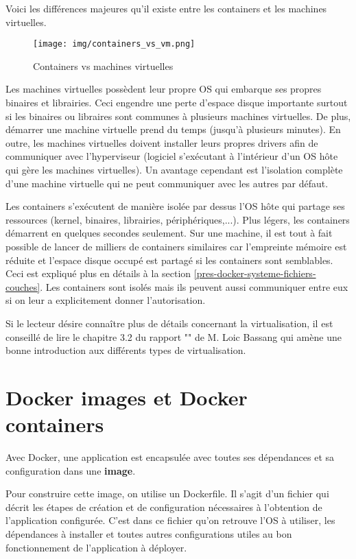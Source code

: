 Voici les différences majeures qu'il existe entre les containers et les machines virtuelles\cite{what_is_docker}.

\begin{figure}[hbtp]
\centering
\texttt{[image: img/containers\_vs\_vm.png]}
\caption{Containers vs machines virtuelles}
\end{figure}

Les machines virtuelles possèdent leur propre OS qui embarque ses propres binaires et librairies. Ceci engendre une perte d'espace disque importante surtout si les binaires ou libraires sont communes à plusieurs machines virtuelles. De plus, démarrer une machine virtuelle prend du temps (jusqu'à plusieurs minutes). En outre, les machines virtuelles doivent installer leurs propres drivers afin de communiquer avec l'hyperviseur (logiciel s'exécutant à l'intérieur d'un OS hôte qui gère les machines virtuelles). Un avantage cependant est l'isolation complète d'une machine virtuelle qui ne peut communiquer avec les autres par défaut.

Les containers s'exécutent de manière isolée par dessus l'OS hôte qui partage ses ressources (kernel, binaires, librairies, périphériques,...). Plus légers, les containers démarrent en quelques secondes seulement. Sur une machine, il est tout à fait possible de lancer de milliers de containers similaires car l'empreinte mémoire est réduite et l'espace disque occupé est partagé si les containers sont semblables. Ceci est expliqué plus en détails à la section \ref{pres-docker-systeme-fichiers-couches}. Les containers sont isolés mais ils peuvent aussi communiquer entre eux si on leur a explicitement donner l'autorisation.

Si le lecteur désire connaître plus de détails concernant la virtualisation, il est conseillé de lire le chapitre 3.2 du rapport "\bassangPrjSemestre" de M. Loic Bassang \cite{bassang_semestre} qui amène une bonne introduction aux différents types de virtualisation.


\section{Docker images et Docker containers}
Avec Docker, une application est encapsulée avec toutes ses dépendances et sa configuration dans une \textbf{image}. 

Pour construire cette image, on utilise un Dockerfile. Il s'agit d'un fichier qui décrit les étapes de création et de configuration nécessaires à l'obtention de l'application configurée. C'est dans ce fichier qu'on retrouve l'OS à utiliser, les dépendances à installer et toutes autres configurations utiles au bon fonctionnement de l'application à déployer. 

